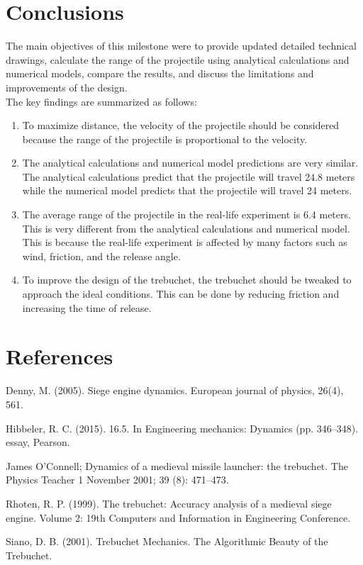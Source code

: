 \documentclass[12pt, titlepage]{article}
\begin{document}
    \section{Conclusions}
    The main objectives of this milestone were to provide updated detailed
    technical drawings, calculate the range of the projectile using 
    analytical calculations and numerical models, compare the results,
    and discuss the limitations and improvements of the design.\\[10pt]
    The key findings are summarized as follows:
    \begin{enumerate}
        \item To maximize distance, the velocity of the projectile should be
        considered because the range of the projectile is proportional to
        the velocity.
        \item The analytical calculations and numerical model predictions are 
        very similar. The analytical calculations predict that the projectile
        will travel 24.8 meters while the numerical model predicts that the
        projectile will travel 24 meters.
        \item The average range of the projectile in the real-life experiment
        is 6.4 meters. This is very different from the analytical calculations
        and numerical model. This is because the real-life experiment is
        affected by many factors such as wind, friction, and the release angle.
        \item To improve the design of the trebuchet, the trebuchet
        should be tweaked to approach the ideal conditions. This can be done
        by reducing friction and increasing the time of release.
    \end{enumerate}
    \newpage
    \section{References}
        \hspace{15pt}Denny, M. (2005). Siege engine dynamics. European journal of physics, 26(4), 561.

        Hibbeler, R. C. (2015). 16.5. In Engineering mechanics: Dynamics (pp. 346–348). essay, Pearson.
        
        James O'Connell; Dynamics of a medieval missile launcher: the trebuchet. The Physics Teacher 1 November 2001; 39 (8): 471–473.

        Rhoten, R. P. (1999). The trebuchet: Accuracy analysis of a medieval siege engine. Volume 2: 19th Computers and Information in Engineering Conference.

        Siano, D. B. (2001). Trebuchet Mechanics. The Algorithmic Beauty of the Trebuchet.
\end{document}
